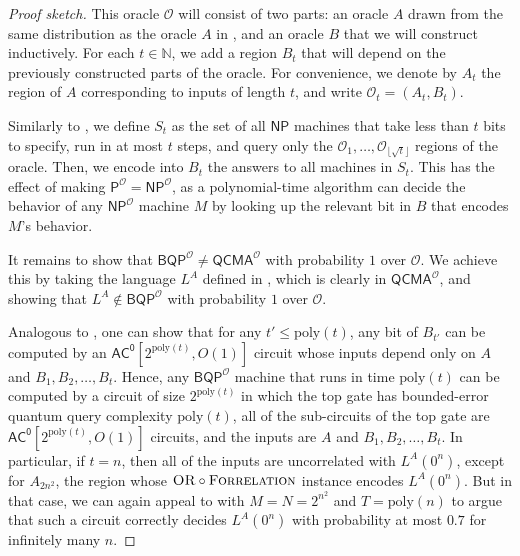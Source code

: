 \documentclass[11pt]{article}%
\newcommand{\Naturals}{\mathbb{N}}
\newcommand{\poly}{\mathrm{poly}}
\newcommand{\OR}{\normalfont\textsc{OR}}
\newcommand{\Forrelation}{\normalfont\textsc{Forrelation}}
\begin{document}
\begin{proof}[Proof sketch]
This oracle $\mathcal{O}$ will consist of two parts: an oracle $A$ drawn from the same distribution as the oracle $A$ in , and an oracle $B$ that we will construct inductively. For each $t \in \Naturals$, we add a region $B_t$ that will depend on the previously constructed parts of the oracle. For convenience, we denote by $A_t$ the region of $A$ corresponding to inputs of length $t$, and write $\mathcal{O}_t = (A_t, B_t)$.

Similarly to , we define $S_t$ as the set of all $\mathsf{NP}$ machines that take less than $t$ bits to specify, run in at most $t$ steps, and query only the $\mathcal{O}_1,\ldots,\mathcal{O}_{\lfloor \sqrt{t} \rfloor}$ regions of the oracle. Then, we encode into $B_t$ the answers to all machines in $S_t$. This has the effect of making $\mathsf{P}^\mathcal{O} = \mathsf{NP}^\mathcal{O}$, as a polynomial-time algorithm can decide the behavior of any $\mathsf{NP}^\mathcal{O}$ machine $M$ by looking up the relevant bit in $B$ that encodes $M$'s behavior.

It remains to show that $\mathsf{BQP}^\mathcal{O} \neq \mathsf{QCMA}^\mathcal{O}$ with probability $1$ over $\mathcal{O}$. We achieve this by taking the language $L^A$ defined in , which is clearly in $\mathsf{QCMA}^\mathcal{O}$, and showing that $L^A \not \in \mathsf{BQP}^\mathcal{O}$ with probability $1$ over $\mathcal{O}$.

Analogous to , one can show that for any $t' \le \poly(t)$, any bit of $B_{t'}$ can be computed by an $\mathsf{AC^0}\left[2^{\poly(t)}, O(1)\right]$ circuit whose inputs depend only on $A$ and $B_1,B_2,\ldots,B_t$. Hence, any $\mathsf{BQP}^\mathcal{O}$ machine that runs in time $\poly(t)$ can be computed by a circuit of size $2^{\poly(t)}$ in which the top gate has bounded-error quantum query complexity $\poly(t)$, all of the sub-circuits of the top gate are $\mathsf{AC^0}\left[2^{\poly(t)}, O(1)\right]$ circuits, and the inputs are $A$ and $B_1,B_2,\ldots,B_t$. In particular, if $t = n$, then all of the inputs are uncorrelated with $L^A(0^n)$, except for $A_{2n^2}$, the region whose $\OR \circ \Forrelation$ instance encodes $L^A(0^n)$. But in that case, we can again appeal to  with $M = N = 2^{n^2}$ and $T = \poly(n)$ to argue that such a circuit correctly decides $L^A(0^n)$ with probability at most $0.7$ for infinitely many $n$.
\end{proof}
\end{document}
